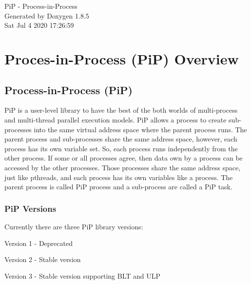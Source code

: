 \documentclass[twoside]{book}
\newcommand{\clearemptydoublepage}{\newpage{\pagestyle{empty}\cleardoublepage}}
\begin{document}
\hypersetup{pageanchor=false}
\begin{titlepage}
\vspace*{7cm}
\begin{center}{\Large Pi\-P -\/ Process-\/in-\/\-Process }\\
\vspace*{1cm}
{\large Generated by Doxygen 1.8.5}\\
\vspace*{0.5cm}
{\small Sat Jul 4 2020 17:26:59}\\
\end{center}
\end{titlepage}
\clearemptydoublepage
\tableofcontents
\clearemptydoublepage
{}
\hypersetup{pageanchor=true}

\chapter{Proces-in-Process (PiP) Overview}
\section*{Process-\/in-\/\-Process (Pi\-P)}

Pi\-P is a user-\/level library to have the best of the both worlds of multi-\/process and multi-\/thread parallel execution models. Pi\-P allows a process to create sub-\/processes into the same virtual address space where the parent process runs. The parent process and sub-\/processes share the same address space, however, each process has its own variable set. So, each process runs independently from the other process. If some or all processes agree, then data own by a process can be accessed by the other processes. Those processes share the same address space, just like pthreads, and each process has its own variables like a process. The parent process is called Pi\-P process and a sub-\/process are called a Pi\-P task.

\subsection*{Pi\-P Versions}

Currently there are three Pi\-P library versions\-:


\begin{DoxyItemize}
\item Version 1 -\/ Deprecated
\item Version 2 -\/ Stable version
\item Version 3 -\/ Stable version supporting B\-L\-T and U\-L\-P
\end{DoxyItemize}
\end{document}
